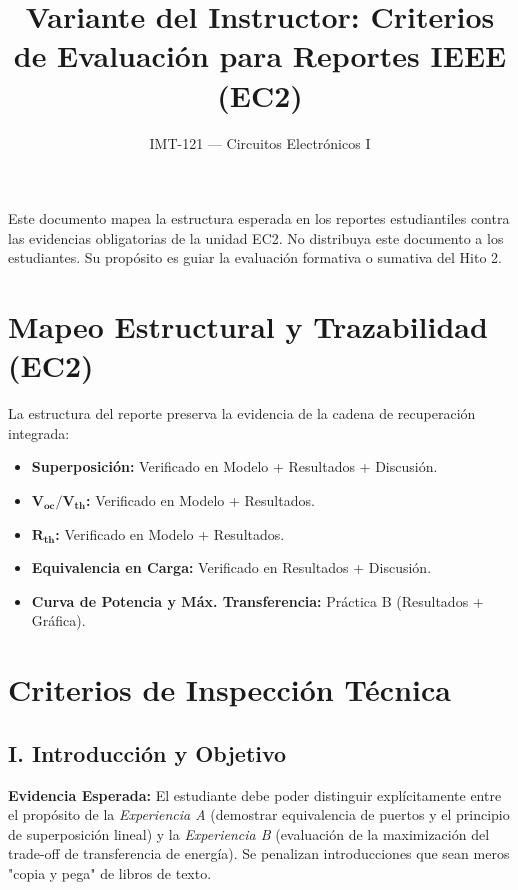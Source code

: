 \documentclass[journal, a4paper]{IEEEtran}
\begin{document}
\title{Variante del Instructor: Criterios de Evaluación para Reportes IEEE (EC2)}
\author{IMT-121 --- Circuitos Electrónicos I}

\maketitle

\begin{tcolorbox}[colback=red!5!white, colframe=red!70!black, title=\textbf{Nota Exclusiva para el Docente}]
Este documento mapea la estructura esperada en los reportes estudiantiles contra las evidencias obligatorias de la unidad EC2. No distribuya este documento a los estudiantes. Su propósito es guiar la evaluación formativa o sumativa del Hito 2.
\end{tcolorbox}

\section{Mapeo Estructural y Trazabilidad (EC2)}

La estructura del reporte preserva la evidencia de la cadena de recuperación integrada:
\begin{itemize}
    \item \textbf{Superposición:} Verificado en Modelo + Resultados + Discusión.
    \item \textbf{$\bm{V_{oc} / V_{th}}$:} Verificado en Modelo + Resultados.
    \item \textbf{$\bm{R_{th}}$:} Verificado en Modelo + Resultados.
    \item \textbf{Equivalencia en Carga:} Verificado en Resultados + Discusión.
    \item \textbf{Curva de Potencia y Máx. Transferencia:} Práctica B (Resultados + Gráfica).
\end{itemize}

\section{Criterios de Inspección Técnica}

\subsection{I. Introducción y Objetivo}
\textbf{Evidencia Esperada:} El estudiante debe poder distinguir explícitamente entre el propósito de la \textit{Experiencia A} (demostrar equivalencia de puertos y el principio de superposición lineal) y la \textit{Experiencia B} (evaluación de la maximización del trade-off de transferencia de energía). Se penalizan introducciones que sean meros "copia y pega" de libros de texto.
\end{document}
